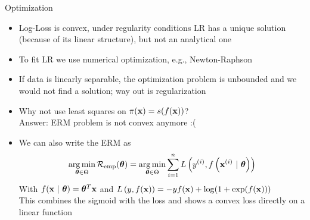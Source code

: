 \documentclass[11pt,compress,t,notes=noshow, xcolor=table]{beamer}
\begin{document}
\begin{vbframe}{Optimization}

\begin{itemize}

\item Log-Loss is convex, under regularity conditions LR has a unique solution (because of its linear structure), but not an analytical one

\item To fit LR we use numerical optimization, e.g., Newton-Raphson

\item If data is linearly separable, the optimization problem is unbounded and we would not find a solution; way out is regularization 

\item Why not use least squares on $\pi(\mathbf{x}) = s(f(\mathbf{x}))$? \\
Answer: ERM problem is not convex anymore :(

\item We can also write the ERM as  
$$
\mathop{\mathrm{arg\,min}}_{\bm{\theta} \in \Theta} \mathcal{R}_{\text{emp}}(\bm{\theta}) = \mathop{\mathrm{arg\,min}}_{\bm{\theta} \in \Theta} \sum\limits_{i=1}^n L\left(y^{(i)}, f\left(\mathbf{x}^{(i)} ~|~ \bm{\theta}\right)\right)
$$
With $f(\mathbf{x} ~|~ \bm{\theta}) = \bm{\theta}^T \mathbf{x}$ and 
$L\left(y, f(\mathbf{x})\right) = -y f(\mathbf{x}) + \log(1 + \exp(f(\mathbf{x}))) $\\
\lz
This combines the sigmoid with the loss and shows a convex loss directly on a linear function
\end{itemize}
\end{vbframe}



\endlecture
\end{document}
